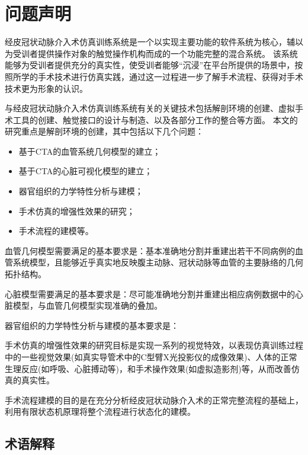 \section{问题声明}
\label{sec1-1}


经皮冠状动脉介入术仿真训练系统是一个以实现主要功能的软件系统为核心，辅以为受训者提供操作对象的触觉操作机构而成的一个功能完整的混合系统。
该系统能够为受训者提供充分的真实性，使受训者能够“沉浸”在平台所提供的场景中，按照所学的手术技术进行仿真实践，通过这一过程进一步了解手术流程、获得对手术技术更为形象的认识。

与经皮冠状动脉介入术仿真训练系统有关的关键技术包括解剖环境的创建、虚拟手术工具的创建、触觉接口的设计与制造、以及各部分工作的整合等方面。
本文的研究重点是解剖环境的创建，其中包括以下几个问题：
\begin{itemize}
  \item 基于CTA的血管系统几何模型的建立；
  \item 基于CTA的心脏可视化模型的建立；
  \item 器官组织的力学特性分析与建模；
  \item 手术仿真的增强性效果的研究；
  \item 手术流程的建模等。
\end{itemize}

血管几何模型需要满足的基本要求是：基本准确地分割并重建出若干不同病例的血管系统模型，且能够近乎真实地反映腹主动脉、冠状动脉等血管的主要脉络的几何拓扑结构。

心脏模型需要满足的基本要求是：尽可能准确地分割并重建出相应病例数据中的心脏模型，与血管几何模型实现准确的叠加。

器官组织的力学特性分析与建模的基本要求是：

手术仿真的增强性效果的研究目标是实现一系列的视觉特效，以表现仿真训练过程中的一些视觉效果(如真实导管术中的C型臂X光投影仪的成像效果)、人体的正常生理反应(如呼吸、心脏搏动等)，和手术操作效果(如虚拟造影剂)等，从而改善仿真的真实性。%

手术流程建模的目的是在充分分析经皮冠状动脉介入术的正常完整流程的基础上，利用有限状态机原理将整个流程进行状态化的建模。

\subsection{术语解释}
\label{sec1-1-2}

